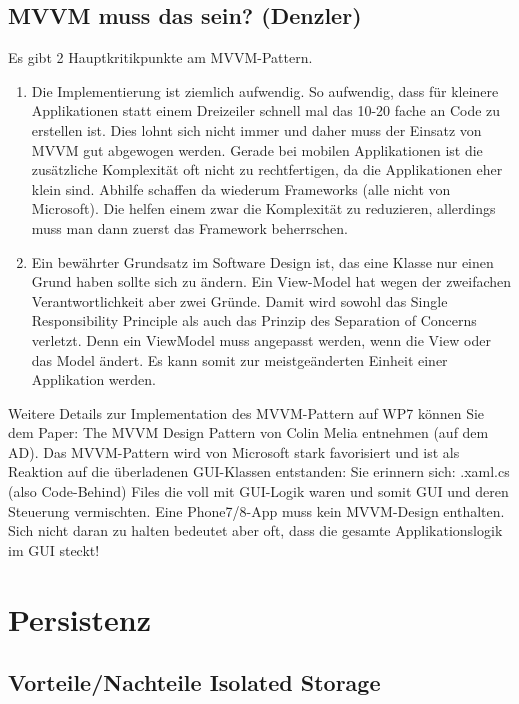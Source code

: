 \documentclass[a4paper,10pt]{scrreprt}
\begin{document}
\section{MVVM muss das sein? (Denzler)}
Es gibt 2 Hauptkritikpunkte am MVVM-Pattern.
\begin{enumerate}


\item  Die Implementierung ist ziemlich aufwendig. So aufwendig, dass für kleinere Applikationen statt einem
Dreizeiler schnell mal das 10-20 fache an Code zu erstellen ist. Dies lohnt sich nicht immer und daher
muss der Einsatz von MVVM gut abgewogen werden. Gerade bei mobilen Applikationen ist die
zusätzliche Komplexität oft nicht zu rechtfertigen, da die Applikationen eher klein sind. Abhilfe schaffen
da wiederum Frameworks (alle nicht von Microsoft). Die helfen einem zwar die Komplexität zu
reduzieren, allerdings muss man dann zuerst das Framework beherrschen.
\item Ein bewährter Grundsatz im Software Design ist, das eine Klasse nur einen Grund haben sollte sich zu
ändern. Ein View-Model hat wegen der zweifachen Verantwortlichkeit aber zwei Gründe. Damit wird
sowohl das Single Responsibility Principle als auch das Prinzip des Separation of Concerns verletzt. Denn
ein ViewModel muss angepasst werden, wenn die View oder das Model ändert. Es kann somit zur
meistgeänderten Einheit einer Applikation werden.
\end{enumerate}
Weitere Details zur Implementation des MVVM-Pattern auf WP7 können Sie dem Paper: The MVVM Design
Pattern von Colin Melia entnehmen (auf dem AD). Das MVVM-Pattern wird von Microsoft stark favorisiert und
ist als Reaktion auf die überladenen GUI-Klassen entstanden: Sie erinnern sich: .xaml.cs (also Code-Behind) Files
die voll mit GUI-Logik waren und somit GUI und deren Steuerung vermischten.
Eine Phone7/8-App muss kein MVVM-Design enthalten. Sich nicht daran zu halten bedeutet aber oft, dass die
gesamte Applikationslogik im GUI steckt!


\chapter{Persistenz}

\section{Vorteile/Nachteile Isolated Storage}
\end{document}
